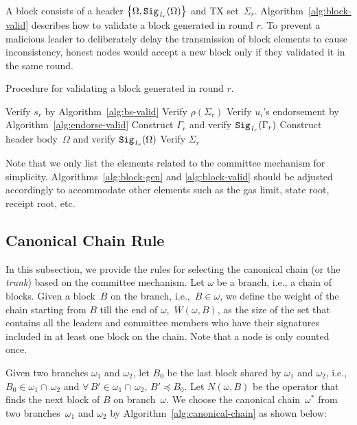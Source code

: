 \documentclass{article}
\begin{document}
A block consists of a header $\left\{\Omega,{\tt Sig}_{\,l_r}(\Omega)\right\}$ and TX set~$\Sigma_r$. Algorithm~\ref{alg:block-valid} describes how to validate a block generated in round $r$. To prevent a malicious leader to deliberately delay the transmission of block elements to cause inconsistency, honest nodes would accept a new block only if they validated it in the same round.

\begin{algorithm}[H]
\caption{Procedure for validating a block generated in round $r$.}
\label{alg:block-valid}
\begin{spacing}{1.2}
\begin{algorithmic}[1]
    \vspace{1ex}
    \State Verify $s_r$ by Algorithm~\ref{alg:bs-valid}
    \State Verify $\rho\left(\Sigma_r\right)$
        \State Verify $u_i$'s endorsement by Algorithm~\ref{alg:endorse-valid}
    \EndFor
    \State Construct $\Gamma_r$ and verify ${\tt Sig}_{\,l_r}(\Gamma_r)$
    \State Construct header body~$\Omega$ and verify ${\tt Sig}_{\,l_r}(\Omega)$
    \State Verify $\Sigma_r$ 
\end{algorithmic}
\end{spacing}
\end{algorithm}

Note that we only list the elements related to the committee mechanism for simplicity. Algorithms~\ref{alg:block-gen} and \ref{alg:block-valid} should be adjusted accordingly to accommodate other elements such as the gas limit, state root, receipt root, etc.

\subsection{Canonical Chain Rule}
In this subsection, we provide the rules for selecting the canonical chain (or the \textit{trunk}) based on the committee mechanism. Let $\omega$ be a branch, i.e., a chain of blocks. Given a block~$B$ on the branch, i.e.,~$B\in\omega$, we define the weight of the chain starting from $B$ till the end of $\omega$,~$W(\omega,B)$, as the size of the set that contains all the leaders and committee members who have their signatures included in at least one block on the chain. Note that a node is only counted once.

Given two branches $\omega_1$ and $\omega_2$, let $B_0$ be the last block shared by $\omega_1$ and $\omega_2$, i.e., $B_0\in\omega_1\cap\,\omega_2$ and $\forall\, B'\in\omega_1\cap\,\omega_2,\, B'\preceq B_0$. Let $N(\omega,B)$ be the operator that finds the next block of $B$ on branch~$\omega$. We choose the canonical chain~$\omega^*$ from two branches~$\omega_1$ and $\omega_2$ by Algorithm~\ref{alg:canonical-chain} as shown below:
\end{document}
